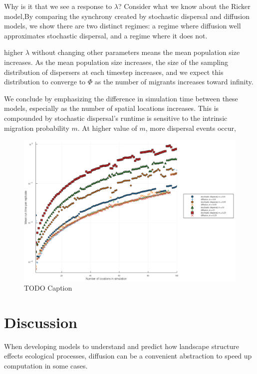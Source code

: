 \documentclass[11pt]{article}
\makeatletter
\def\maxwidth{\ifdim\Gin@nat@width>\linewidth\linewidth
\else\Gin@nat@width\fi}
\let\Oldincludegraphics\includegraphics
\renewcommand{\includegraphics}[1]{\Oldincludegraphics[width=\maxwidth]{#1}}
\makeatother
\begin{document}
Why is it that we see a response to \(\lambda\)? Consider what we know
about the Ricker model,By comparing the synchrony created by stochastic
dispersal and diffusion models, we show there are two distinct regimes:
a regime where diffusion well approximates stochastic dispersal, and a
regime where it does not.

higher \(\lambda\) without changing other parameters means the mean
population size increases. As the mean population size increases, the
size of the sampling distribution of dispersers at each timestep
increases, and we expect this distribution to converge to \(\Phi\) as
the number of migrants increases toward infinity.

We conclude by emphasizing the difference in simulation time between
these models, especially as the number of spatial locations increases.
This is compounded by stochastic dispersal's runtime is sensitive to the
intrinsic migration probability \(m\). At higher value of \(m\), more
dispersal events occur,

\begin{figure}
\hypertarget{fig:runtime}{%
\centering
\includegraphics{./figures/runtime.png}
\caption{TODO Caption}\label{fig:runtime}
}
\end{figure}

\hypertarget{discussion}{%
\section{Discussion}\label{discussion}}

When developing models to understand and predict how landscape structure
effects ecological processes, diffusion can be a convenient abstraction
to speed up computation in some cases.
\end{document}

